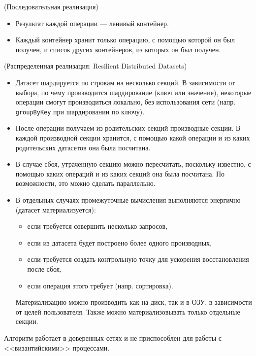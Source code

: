 \begin{algorithm}(Последовательная реализация)
  \begin{itemize}
    \item Результат каждой операции --- ленивый контейнер.
    \item Каждый контейнер хранит только операцию, с помощью которой он был
      получен, и список других контейнеров, из которых он был получен.
  \end{itemize}
\end{algorithm}

\begin{algorithm}(Распределенная реализация: Resilient Distributed Datasets)
  \begin{itemize}
    \item Датасет шардируется по строкам на несколько секций. В зависимости от
      выбора, по чему производится шардирование (ключ или значение), некоторые
      операции смогут производиться локально, без использования сети (напр.
      \newline \texttt{groupByKey} при шардировании по ключу).
    \item После операции получаем из родительских секций производные секции.
      В каждой производной секции хранится, с помощью какой операции и из каких
      родительских датасетов она была посчитана.
    \item В случае сбоя, утраченную секцию можно пересчитать, поскольку
      известно, с помощью каких операций и из каких секций она была посчитана.
      По возможности, это можно сделать параллельно.
    \item В отдельных случаях промежуточные вычисления выполняются энергично
      (датасет материализуется):
      \begin{itemize}
        \item если требуется совершить несколько запросов,
        \item если из датасета будет построено более одного производных,
        \item если требуется создать контрольную точку для ускорения
          восстановления после сбоя,
        \item если операция этого требует (напр. сортировка).
      \end{itemize}
      Материализацию можно производить как на диск, так и в ОЗУ, в зависимости
      от целей пользователя. Также можно материализовывать только отдельные
      секции.
  \end{itemize}
\end{algorithm}

\begin{remark} Алгоритм работает в доверенных сетях и не приспособлен для
  работы с <<византийскими>> процессами.
\end{remark}
